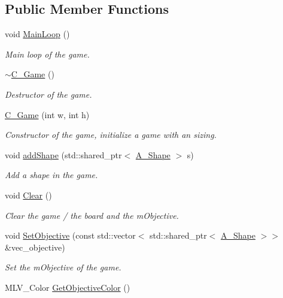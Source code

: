 \subsection*{Public Member Functions}
\begin{DoxyCompactItemize}
\item 
void \hyperlink{classC__Game_aa15149075c2a4bd4704235d83c1c4f20}{Main\+Loop} ()
\begin{DoxyCompactList}\small\item\em Main loop of the game. \end{DoxyCompactList}\item 
\hyperlink{classC__Game_a4a11981e90a66634568f59ac823a697e}{$\sim$\+C\+\_\+\+Game} ()
\begin{DoxyCompactList}\small\item\em Destructor of the game. \end{DoxyCompactList}\item 
\hyperlink{classC__Game_ac5a1aba1deb606a281d3992459566716}{C\+\_\+\+Game} (int w, int h)
\begin{DoxyCompactList}\small\item\em Constructor of the game, initialize a game with an sizing. \end{DoxyCompactList}\item 
void \hyperlink{classC__Game_ad2b7512192879ec7cd76d4eed4fef938}{add\+Shape} (std\+::shared\+\_\+ptr$<$ \hyperlink{classA__Shape}{A\+\_\+\+Shape} $>$ s)
\begin{DoxyCompactList}\small\item\em Add a shape in the game. \end{DoxyCompactList}\item 
void \hyperlink{classC__Game_a1ad2e168bba0305e48c0bf8e162a889a}{Clear} ()
\begin{DoxyCompactList}\small\item\em Clear the game / the board and the m\+Objective. \end{DoxyCompactList}\item 
void \hyperlink{classC__Game_a0fa57725991fb2b249eb40dd776a68c4}{Set\+Objective} (const std\+::vector$<$ std\+::shared\+\_\+ptr$<$ \hyperlink{classA__Shape}{A\+\_\+\+Shape} $>$$>$ \&vec\+\_\+objective)
\begin{DoxyCompactList}\small\item\em Set the m\+Objective of the game. \end{DoxyCompactList}\item 
M\+L\+V\+\_\+\+Color \hyperlink{classC__Game_a0efbb25a7daf4411b2dfe3055530ac85}{Get\+Objective\+Color} ()
$$
\end{DoxyCompactItemize}
